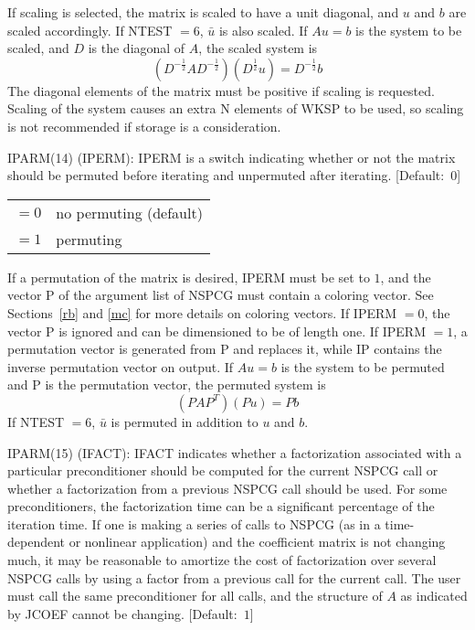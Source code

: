 \begin{list}{}{
               \leftmargin 1.00in \rightmargin 0.25in}
         If scaling is selected, the matrix is scaled to have a unit
         diagonal, and  $u$ and $b$ are scaled accordingly.  If
         NTEST $= 6$, $\bar{u}$ is also scaled.
         If $Au=b$ is the system to be scaled, and $D$ is the diagonal
         of $A$, the scaled system is
         \[
              (D^{-\frac{1}{2}}AD^{-\frac{1}{2}})
                   (D^{\frac{1}{2}}u)=D^{-\frac{1}{2}}b
         \]
         The diagonal elements of the matrix must be positive if
         scaling is requested.  Scaling of the system causes an
         extra N elements of WKSP to be used, so scaling is not
         recommended if storage is a consideration.
 
\item[IPARM(14) \hfill](IPERM):
         IPERM is a switch indicating whether or not the matrix
         should be permuted before iterating and unpermuted after
         iterating.  \mbox{[Default: $0$]}
 
         \begin{tabular}{ll}
          $= 0$ & no permuting (default) \\
          $= 1$ & permuting
         \end{tabular}
 
         If a permutation of the matrix is desired, IPERM must be set
         to $1$, and the vector P of the argument list of NSPCG must
         contain a coloring vector.  See Sections~\ref{rb} and 
         \ref{mc} for more details on
         coloring vectors.  If IPERM $= 0$, the vector P is ignored and
         can be dimensioned to be of length one.  If IPERM $= 1$, a
         permutation vector is generated from P and replaces it, while
         IP contains the inverse permutation vector on output.
         If $Au=b$ is the system to be permuted and P is the
         permutation vector, the permuted system is
         \[
           (PAP^T) (Pu) = Pb
         \]
         If NTEST $= 6$, $\bar{u}$ is permuted in addition to
         $u$ and $b$.
 
\item[IPARM(15) \hfill](IFACT):
         IFACT indicates whether a factorization associated with a
         particular preconditioner should be computed for the
         current NSPCG call or whether a factorization from a
         previous NSPCG call should be used.  For some preconditioners,
         the factorization time can be a significant percentage of
         the iteration time.  If one is making a series of calls to
         NSPCG (as in a time-dependent or nonlinear application) and
         the coefficient matrix is not changing much, it may be
         reasonable to amortize the cost of factorization over several
         NSPCG calls by using a factor from a previous call for the
         current call.  The user must call the same preconditioner
         for all calls, and the structure of $A$ as indicated by JCOEF
         cannot be changing.  \mbox{[Default: $1$]}
 

\end{list}

